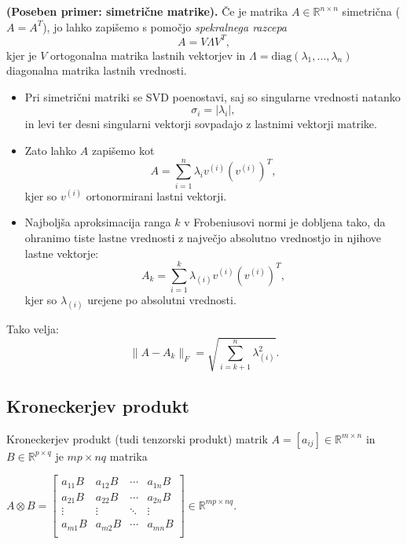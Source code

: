 \documentclass{article}
\begin{document}
\begin{multicols}{2}
    \textbf{(Poseben primer: simetrične matrike).}
    Če je matrika \( A \in \mathbb{R}^{n \times n} \) simetrična (\( A = A^T \)), jo lahko zapišemo s pomočjo
    \emph{spekralnega razcepa}
    \[
    	A = V \Lambda V^T,
    \]
    kjer je \( V \) ortogonalna matrika lastnih vektorjev in \( \Lambda = \mathrm{diag}(\lambda_1, \ldots, \lambda_n) \) diagonalna matrika lastnih vrednosti.
    
    \begin{itemize}
    	\item Pri simetrični matriki se SVD poenostavi, saj so singularne vrednosti natanko
    	\[
    		\sigma_i = |\lambda_i|,
    	\]
    	in levi ter desni singularni vektorji sovpadajo z lastnimi vektorji matrike.
    	\item Zato lahko \( A \) zapišemo kot
    	\[
    		A = \sum_{i=1}^n \lambda_i v^{(i)} (v^{(i)})^T,
    	\]
    	kjer so \( v^{(i)} \) ortonormirani lastni vektorji.
    	\item Najboljša aproksimacija ranga \( k \) v Frobeniusovi normi je dobljena tako,
    	da ohranimo tiste lastne vrednosti z največjo absolutno vrednostjo in njihove lastne vektorje:
    	\[
    		A_k = \sum_{i=1}^k \lambda_{(i)} v^{(i)} (v^{(i)})^T,
    	\]
    	kjer so \( \lambda_{(i)} \) urejene po absolutni vrednosti.
    \end{itemize}
    
    Tako velja:
    \[
    	\| A - A_k \|_F = \sqrt{\sum_{i=k+1}^n \lambda_{(i)}^2}.
    \]

	\subsection{Kroneckerjev produkt}

	Kroneckerjev produkt (tudi tenzorski produkt) matrik \( A = [a_{ij}] \in \mathbb{R}^{m \times n} \) in \( B \in \mathbb{R}^{p \times q} \) je \( mp \times nq \) matrika

	\begin{math}
		A \otimes B =
		\begin{bmatrix}
			a_{11}B & a_{12}B & \cdots & a_{1n}B \\
			a_{21}B & a_{22}B & \cdots & a_{2n}B \\
			\vdots  & \vdots  & \ddots & \vdots  \\
			a_{m1}B & a_{m2}B & \cdots & a_{mn}B \\
		\end{bmatrix}
		\in \mathbb{R}^{mp \times nq}.
	\end{math}


\end{multicols}
\end{document}
